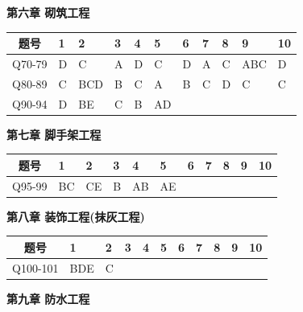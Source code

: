 \documentclass[UTF8,fontset=windows,11pt]{ctexart}
\begin{document}
\noindent\textbf{\textcolor{examnavy}{第六章  砌筑工程}}\\\vspace{0.3em}

\begin{tabularx}{\linewidth}{|c|X|X|X|X|X|X|X|X|X|X|}
\hline
\textbf{题号} & \textbf{1} & \textbf{2} & \textbf{3} & \textbf{4} & \textbf{5} & \textbf{6} & \textbf{7} & \textbf{8} & \textbf{9} & \textbf{10} \\
\hline
Q70-79 & D & C & A & D & C & D & A & C & ABC & D \\
\hline
Q80-89 & C & BCD & B & C & A & B & C & D & C & C \\
\hline
Q90-94 & D & BE & C & B & AD &  &  &  &  &  \\
\hline
\end{tabularx}
\vspace{0.6em}

\noindent\textbf{\textcolor{examnavy}{第七章  脚手架工程}}\\\vspace{0.3em}

\begin{tabularx}{\linewidth}{|c|X|X|X|X|X|X|X|X|X|X|}
\hline
\textbf{题号} & \textbf{1} & \textbf{2} & \textbf{3} & \textbf{4} & \textbf{5} & \textbf{6} & \textbf{7} & \textbf{8} & \textbf{9} & \textbf{10} \\
\hline
Q95-99 & BC & CE & B & AB & AE &  &  &  &  &  \\
\hline
\end{tabularx}
\vspace{0.6em}

\noindent\textbf{\textcolor{examnavy}{第八章  装饰工程(抹灰工程)}}\\\vspace{0.3em}

\begin{tabularx}{\linewidth}{|c|X|X|X|X|X|X|X|X|X|X|}
\hline
\textbf{题号} & \textbf{1} & \textbf{2} & \textbf{3} & \textbf{4} & \textbf{5} & \textbf{6} & \textbf{7} & \textbf{8} & \textbf{9} & \textbf{10} \\
\hline
Q100-101 & BDE & C &  &  &  &  &  &  &  &  \\
\hline
\end{tabularx}
\vspace{0.6em}

\noindent\textbf{\textcolor{examnavy}{第九章  防水工程}}\\\vspace{0.3em}
\end{document}
